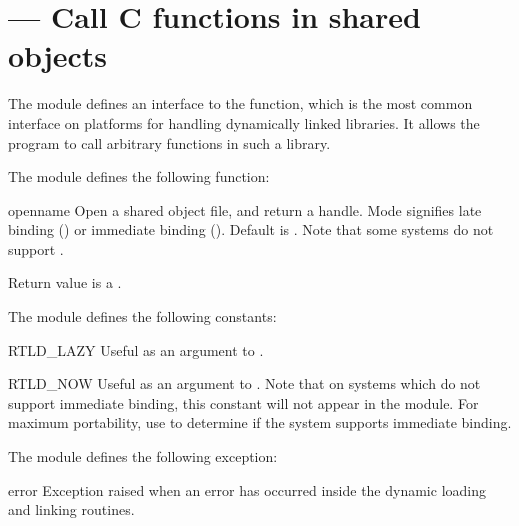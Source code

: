 \section{ ---
         Call C functions in shared objects}

The  module defines an interface to the
 function, which is the most common interface on
\UNIX{} platforms for handling dynamically linked libraries. It allows
the program to call arbitrary functions in such a library.


The  module defines the following function:

\begin{funcdesc}{open}{name}
Open a shared object file, and return a handle. Mode
signifies late binding () or immediate binding
(). Default is . Note that some
systems do not support .

Return value is a .
\end{funcdesc}

The  module defines the following constants:

\begin{datadesc}{RTLD_LAZY}
Useful as an argument to .
\end{datadesc}

\begin{datadesc}{RTLD_NOW}
Useful as an argument to .  Note that on systems
which do not support immediate binding, this constant will not appear
in the module. For maximum portability, use  to
determine if the system supports immediate binding.
\end{datadesc}

The  module defines the following exception:

\begin{excdesc}{error}
Exception raised when an error has occurred inside the dynamic loading
and linking routines.
\end{excdesc}

